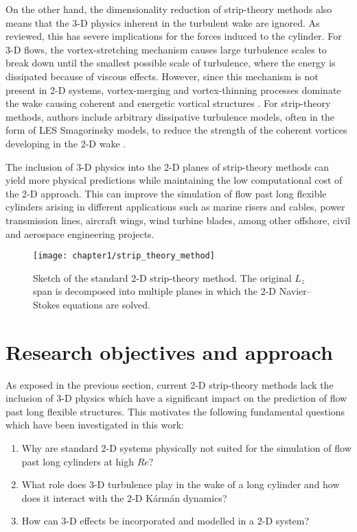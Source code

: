 \documentclass[../main.tex]{subfiles}
\begin{document}
On the other hand, the dimensionality reduction of strip-theory methods also means that the 3-D physics inherent in the turbulent wake are ignored.
As reviewed, this has severe implications for the forces induced to the cylinder.
For 3-D flows, the vortex-stretching mechanism causes large turbulence scales to break down until the smallest possible scale of turbulence, where the energy is dissipated because of viscous effects.
However, since this mechanism is not present in 2-D systems, vortex-merging and  vortex-thinning processes dominate the wake causing coherent and energetic vortical structures \citep{Boffetta2012,Xiao2009}.
For strip-theory methods, authors include arbitrary dissipative turbulence models, often in the form of LES Smagorinsky models, to reduce the strength of the coherent vortices developing in the 2-D wake \citep{Bao2016}.

The inclusion of 3-D physics into the 2-D planes of strip-theory methods can yield more physical predictions while maintaining the low computational cost of the 2-D approach.
This can improve the simulation of flow past long flexible cylinders arising in different applications such as marine risers and cables, power transmission lines, aircraft wings, wind turbine blades, among other offshore, civil and aerospace engineering projects.

\begin{figure}
\centering
\texttt{[image: chapter1/strip\_theory\_method]}
\caption{Sketch of the standard 2-D strip-theory method.
The original $L_z$ span is decomposed into multiple planes in which the 2-D Navier--Stokes equations are solved.}
\label{fig:stm}
\end{figure}

\section{Research objectives and approach}

As exposed in the previous section, current 2-D strip-theory methods lack the inclusion of 3-D physics which have a significant impact on the prediction of flow past long flexible structures.
This motivates the following fundamental questions which have been investigated in this work:
\begin{enumerate}
	\item Why are standard 2-D systems physically not suited for the simulation of flow past long cylinders at high $Re$?
	\item What role does 3-D turbulence play in the wake of a long cylinder and how does it interact with the 2-D K\'{a}rm\'{a}n dynamics?
	\item How can 3-D effects be incorporated and modelled in a 2-D system?
\end{enumerate}
\end{document}
